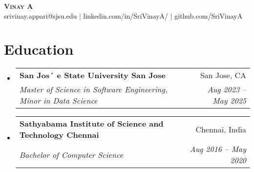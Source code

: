 \documentclass{article}
\makeatletter
\newcommand{\resumeSubheading}[4]{
  \vspace{-2pt}\item
    \begin{tabular*}{0.97\textwidth}[t]{l@{\extracolsep{\fill}}r}
      \textbf{#1} & #2 \\
      \textit{\small#3} & \textit{\small #4} \\
    \end{tabular*}\vspace{-7pt}
}
\newcommand{\resumeSubHeadingListStart}{\begin{itemize}[leftmargin=0.15in, label={}]}
\newcommand{\resumeSubHeadingListEnd}{\end{itemize}}
\makeatother
\begin{document}
\begin{center}
\textbf{\Huge \scshape Vinay A} \\ \vspace{1pt}
\small srivinay.appari@sjsu.edu $|$ linkedin.com/in/SriVinayA/ $|$ github.com/SriVinayA
\end{center}


\section{Education}
\resumeSubHeadingListStart
\resumeSubheading
{San Jos´ e State University San Jose}{San Jose, CA}
{Master of Science in Software Engineering, Minor in Data Science}{Aug 2023 – May 2025}
\resumeSubheading
{Sathyabama Institute of Science and Technology Chennai}{Chennai, India}
{Bachelor of Computer Science}{Aug 2016 – May 2020}
\resumeSubHeadingListEnd



\end{document}
